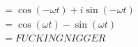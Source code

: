 \documentclass[preview]{standalone}
\begin{document}
\begin{align*}
&=\cos{(-\omega t)}+i\sin{(-\omega t)} \\ &= \cos{(\omega t)}-\sin{(\omega t)} \\ &= FUCKING NIGGER
\end{align*}
\end{document}
